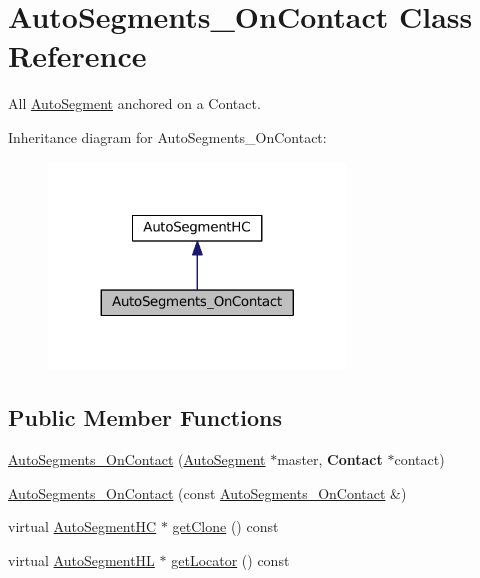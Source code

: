 \hypertarget{classKatabatic_1_1AutoSegments__OnContact}{}\section{Auto\+Segments\+\_\+\+On\+Contact Class Reference}
\label{classKatabatic_1_1AutoSegments__OnContact}


All \mbox{\hyperlink{classKatabatic_1_1AutoSegment}{Auto\+Segment}} anchored on a Contact.  




Inheritance diagram for Auto\+Segments\+\_\+\+On\+Contact\+:\nopagebreak
\begin{figure}[H]
\begin{center}
\leavevmode
\includegraphics[width=224pt]{classKatabatic_1_1AutoSegments__OnContact__inherit__graph}
\end{center}
\end{figure}
\subsection*{Public Member Functions}
\begin{DoxyCompactItemize}
\item 
\mbox{\hyperlink{classKatabatic_1_1AutoSegments__OnContact_af3f727d0c0fe394da508f52a6c9e4b90}{Auto\+Segments\+\_\+\+On\+Contact}} (\mbox{\hyperlink{classKatabatic_1_1AutoSegment}{Auto\+Segment}} $\ast$master, \textbf{ Contact} $\ast$contact)
\item 
\mbox{\hyperlink{classKatabatic_1_1AutoSegments__OnContact_ab6ff1773c5335fe496f61f2703a5ac99}{Auto\+Segments\+\_\+\+On\+Contact}} (const \mbox{\hyperlink{classKatabatic_1_1AutoSegments__OnContact}{Auto\+Segments\+\_\+\+On\+Contact}} \&)
\item 
virtual \mbox{\hyperlink{namespaceKatabatic_acb3628dc7705fefe38a665cfe43efa6e}{Auto\+Segment\+HC}} $\ast$ \mbox{\hyperlink{classKatabatic_1_1AutoSegments__OnContact_a5b26b0698bdcb40cbf51b250dfb21858}{get\+Clone}} () const
\item 
virtual \mbox{\hyperlink{namespaceKatabatic_a40ef13471fd0e797b75d3c436813fe65}{Auto\+Segment\+HL}} $\ast$ \mbox{\hyperlink{classKatabatic_1_1AutoSegments__OnContact_a07665c070fcc269aec02ce842f384483}{get\+Locator}} () const
\end{DoxyCompactItemize}


